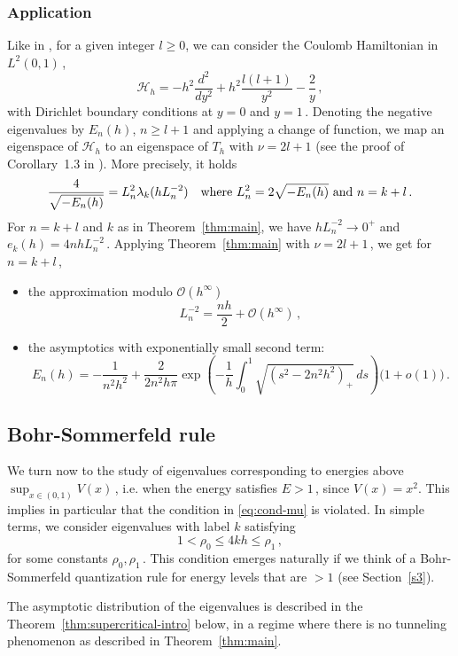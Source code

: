 \documentclass[11pt]{amsart}
\numberwithin{equation}{section}
\theoremstyle{remark}
\begin{document}
\subsubsection*{Application} 
Like in \cite[Corollary~1.3]{Gannot}, for a given integer $l \geq 0$, we can consider the Coulomb Hamiltonian in $L^2(0,1)\,$,
\[\mathcal H_h=-h^2\frac{d^2}{dy^2}+h^2\frac{l (l+1)}{y^2}-\frac{2}{y}\,,\]
with Dirichlet boundary conditions at $y=0$ and $y=1\,$. Denoting the negative eigenvalues by $E_{n}(h)$, $n\geq l+1$ and applying a change of function, we  map  an eigenspace of $\mathcal H_h$ to an eigenspace of $T_h$ with $\nu=2l +1$  (see the proof of Corollary~1.3 in \cite{Gannot}). More precisely, it holds
\[\frac{4}{\sqrt{-E_{n}(h)}}=L_n^2\lambda_k(hL_n^{-2})\quad\text{where $L_n^2=2\sqrt{-E_{n}(h)}$ and $n=k+l$\,.} \]
For $n=k+l$ and $k$ as in Theorem~\ref{thm:main}, we have $hL_n^{-2}\to0^+$ and $e_k(h)=4nh L_n^{-2}\,$. Applying Theorem~\ref{thm:main} with $\nu=2l +1\,$, we get for $n=k+l\,$,
\begin{itemize}
\item the  approximation modulo $\mathcal O (h^\infty)$
\[L_n^{-2}=\frac{nh}{2}+\mathcal O(h^\infty)\,,\]
\item the  asymptotics with exponentially small second term:
\[E_{n}(h)=-\frac{1}{n^2 h^2}+\frac{2}{2n^2h\pi}\exp\left(-\frac{1}{h}\int_0^1 \sqrt{(s^2-2n^2h^2)_+}\,ds\right)\bigl(1+o(1)\bigr)\,.\]
\end{itemize}
%





\subsection{Bohr-Sommerfeld rule}


We turn now to the study of eigenvalues corresponding to energies above  $\sup_{x\in (0,1)} V(x)\,$, i.e.  when the energy satisfies $E>1\,$, since $V(x)=x^2$.  This implies in particular that the condition in \eqref{eq:cond-mu} is violated. In simple terms, we consider eigenvalues with label $k$ satisfying
\[
1<\rho_0\leq 4kh
\leq
\rho_1\,,
\]
for some constants $\rho_0,\rho_1\,$.  This condition emerges naturally if  we think of  a Bohr-Sommerfeld quantization rule for energy levels that are $>1$ (see Section~\ref{s3}).

The asymptotic distribution of the eigenvalues is described in the Theorem~\ref{thm:supercritical-intro} below, in a regime where there is no
tunneling phenomenon as described in Theorem~\ref{thm:main}.
\end{document}
